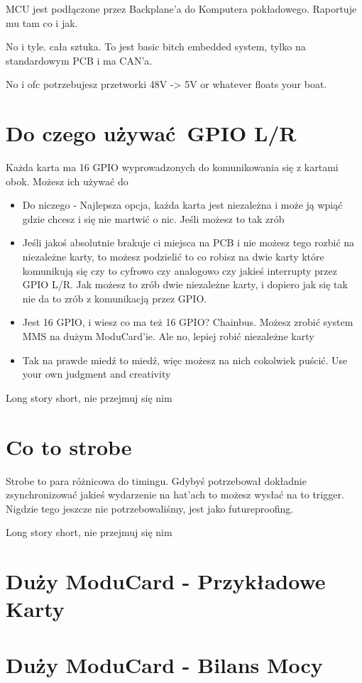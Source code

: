 \documentclass[b5paper, 10pt, twoside]{book}
\begin{document}
MCU jest podłączone przez Backplane'a do Komputera pokładowego. Raportuje mu tam co i jak.

No i tyle. cała sztuka. To jest basic bitch embedded system, tylko na standardowym PCB i ma CAN'a.

No i ofc potrzebujesz przetworki 48V -> 5V or whatever floats your boat.


\section{Do czego używać GPIO L/R} \label{Duży ModuCard -  GPIO}
Każda karta ma 16 GPIO wyprowadzonych do komunikowania się z kartami obok. Możesz ich używać do
\begin{itemize}
  \item Do niczego - Najlepsza opcja, każda karta jest niezależna i może ją wpiąć gdzie chcesz i się nie martwić o nic. Jeśli możesz to tak zrób
  \item Jeśli jakoś absolutnie brakuje ci miejsca na PCB i nie możesz tego rozbić na niezależne karty, to możesz podzielić to co robisz na dwie karty które komunikują się czy to cyfrowo czy analogowo czy jakieś interrupty przez GPIO L/R. Jak możesz to zrób dwie niezależne karty, i dopiero jak się tak nie da to zrób z komunikacją przez GPIO.
  \item Jest 16 GPIO, i wiesz co ma też 16 GPIO? Chainbus. Możesz zrobić system MMS na dużym ModuCard'ie. Ale no, lepiej robić niezależne karty
  \item Tak na prawde miedź to miedź, więc możesz na nich cokolwiek puścić. Use your own judgment and creativity
\end{itemize}

Long story short, nie przejmuj się nim
\section{Co to strobe} \label{Duży ModuCard - Strobe}
Strobe to para różnicowa do timingu. Gdybyś potrzebował dokładnie zsynchronizować jakieś wydarzenie na hat'ach to możesz wysłać na to trigger. Nigdzie tego jeszcze nie potrzebowaliśmy, jest jako futureproofing.

Long story short, nie przejmuj się nim
\section{Duży ModuCard - Przykładowe Karty}
\section{Duży ModuCard - Bilans Mocy}\label{Duży ModuCard - Bilans Mocy}
\end{document}
